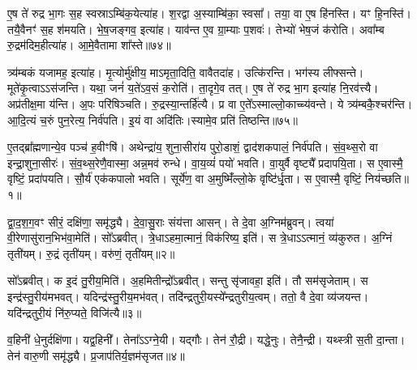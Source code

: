 ए॒ष ते॑ रुद्र भा॒गः स॒ह स्वस्रा\-ऽम्बि॑क॒येत्या॑ह।
श॒रद्वा अ॒स्याम्बि॑का॒ स्वसा᳚।
तया॒ वा ए॒ष हि॑नस्ति।
यꣳ हि॒नस्ति॑।
तयै॒वैनꣳ॑ स॒ह श॑मयति।
भे॒ष॒जङ्गव॒ इत्या॑ह।
याव॑न्त ए॒व ग्रा॒म्याः प॒शवः॑।
तेभ्यो॑ भेष॒जं क॑रोति।
अवा᳚म्ब रु॒द्रम॑दिम॒हीत्या॑ह।
आ॒\-मे॒वैतामा शा᳚स्ते॥७४॥\ip

त्र्य॑म्बकं यजामह॒ इत्या॑ह।
मृ॒त्योर्मु॑क्षीय॒ माऽमृता॒दिति॒ वावैतदा॑ह।
उत्कि॑रन्ति।
भग॑स्य लीफ्सन्ते।
मूते॑कृ॒त्वा\-ऽऽस॑जन्ति।
यथा॒ जनं॑ य॒ते॑\-ऽव॒सं क॒रोति॑।
ता॒दृगे॒व तत्।
ए॒ष ते॑ रुद्र भा॒ग इत्या॑ह नि॒रव॑त्त्यै।
अप्र॑तीक्ष॒मा य॑न्ति।
अ॒पः परि॑षिञ्चति।
रु॒द्रस्या॒न्तर्\mbox{}हि॑त्यै।
प्र वा ए॒ते᳚\-ऽस्माल्लो॒काच्च्य॑वन्ते।
ये त्र्य॑म्बकै॒श्चर॑न्ति।
आ॒दि॒त्यं च॒रुं पुन॒रेत्य॒ निर्व॑पति।
इ॒यं वा अदि॑तिः।स्यामे॒व प्रति॑ तिष्ठन्ति॥७५॥\ip\anuvakamend[य॒न्ति॒ ब्रू॒या॒न्नि॒रव॑दयते शास्ते सिञ्चति॒ षट्च॑]


\clearpage
{}
\setcounter{anuvakam}{0}

ए॒तद्ब्रा᳚ह्मणान्ये॒व पञ्च॑ ह॒वीꣳषि॑।
अथेन्द्रा॑य॒ शुना॒सीरा॑य पुरो॒डाशं॒ द्वाद॑शकपालं॒ निर्व॑पति।
सं॒व॒थ्स॒रो वा इन्द्रा॒शुना॒सीरः॑।
सं॒व॒थ्स॒रेणै॒वास्मा॒ अन्न॒मव॑ रुन्धे।
वा॒य॒व्यं॑ पयो॑ भवति।
वा॒युर्वै वृष्ट्यै᳚ प्रदापयि॒ता।
स ए॒वास्मै॒ वृष्टिं॒ प्रदा॑पयति।
सौ॒र्य॑ एक॑कपालो भवति।
सूर्ये॑ण॒ वा अ॒मुष्मिँ॑ल्लो॒के वृष्टि॑र्धृ॒ता।
स ए॒वास्मै॒ वृष्टिं॒ निय॑च्छति॥१॥\ip

द्वा॒द॒श॒ग॒वꣳ सीरं॒ दक्षि॑णा॒ समृ॑द्ध्यै।
दे॒वा॒सु॒राः संय॑त्ता आसन्।
ते दे॒वा अ॒ग्निम॑ब्रुवन्।
त्वया॑ वी॒रेणासु॑रान॒भिभ॑वा॒मेति॑।
सो᳚ऽब्रवीत्।
त्रे॒धा\-ऽहमा॒त्मानं॒ विक॑रिष्य॒ इति॑।
स त्रे॒धा\-ऽऽत्मानं॒ व्य॑कुरुत।
अ॒ग्निं तृती॑यम्।
रु॒द्रं तृती॑यम्।
वरु॑णं॒ तृती॑यम्॥२॥\ip

सो᳚ऽब्रवीत्।
क इ॒दं तु॒रीय॒मिति॑।
अ॒हमितीन्द्रो᳚\-ऽब्रवीत्।
सन्तु सृ॑जावहा॒ इति॑।
तौ सम॑सृजेताम्।
स इन्द्र॑स्तु॒रीय॑मभवत्।
यदिन्द्र॑स्तु॒रीय॒मभ॑वत्।
तदि॑न्द्र\-तुरी॒यस्ये᳚न्द्र\-तुरीय॒त्वम्।
ततो॒ वै दे॒वा व्य॑जयन्त।
यदि॑न्द्रतुरी॒यं नि॑रु॒प्यते॒ विजि॑त्यै॥३॥\ip

व॒हिनी॑ धे॒नुर्दक्षि॑णा।
यद्व॒हिनी᳚।
तेना᳚ऽऽग्ने॒यी।
यद्गौः।
तेन॑ रौ॒द्री।
यद्धे॒नुः।
तेनै॒न्द्री।
यथ्स्त्री स॒ती दा॒न्ता।
तेन॑ वारु॒णी समृ॑द्ध्यै।
प्र॒जा\-प॑तिर्य॒ज्ञम॑\-सृजत॥४॥\ip

